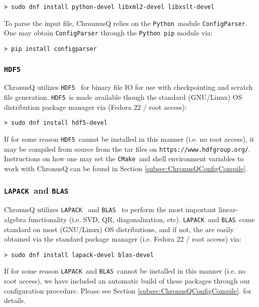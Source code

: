 \documentclass[12pt]{article}
\newcommand{\CMake}{\texttt{CMake}}
\newcommand{\HDF}{\texttt{HDF5}}
\newcommand{\LAPACK}{\texttt{LAPACK}}
\newcommand{\BLAS}{\texttt{BLAS}}
\newcommand{\Python}{\texttt{Python}}
\begin{document}
	\begin{lstlisting}
> sudo dnf install python-devel libxml2-devel libxslt-devel
	\end{lstlisting}

        \noindent To parse the input file, ChrounusQ relies on the \Python~module 
	\texttt{ConfigParser}. One may obtain \texttt{ConfigParser} through
	the \Python~\texttt{pip} module via:
	 
	\begin{lstlisting}
> pip install configparser
	\end{lstlisting}

      \subsubsection{\HDF} \label{subsubsec:HDF5} 
        ChronusQ utilizes \HDF~\cite{hdf5} for binary file IO for use with 
        checkpointing and scratch file generation. \HDF~is made available
	though the standard (GNU/Linux) OS distribution package manager via
	(Fedora 22 / root access):

	\begin{lstlisting}
> sudo dnf install hdf5-devel
	\end{lstlisting}

	\noindent If for some reason \HDF~cannot be installed in this manner (i.e. 
	no root access), it may be compiled from source from the tar files on
	\texttt{https://www.hdfgroup.org/}. Instructions on how one may set
	the \CMake~and shell environment variables to work with ChronusQ
	can be found in Section \ref{subsec:ChronusQConfigCompile}.

      \subsubsection{\LAPACK~and \BLAS} \label{subsubsec:LA} 
        ChronusQ utilizes \LAPACK~\cite{lapack} and \BLAS~\cite{blas1,blas2,blas3,atlas} to perform
        the most important linear-algebra functionality (i.e. SVD, QR, 
	diagonalization, etc). \LAPACK~and \BLAS~come standard on most
	(GNU/Linux) OS distributions, and if not, the are easily obtained via
	the standard package manager (i.e. Fedora 22 / root access) via:

	\begin{lstlisting}
> sudo dnf install lapack-devel blas-devel
	\end{lstlisting}

	\noindent If for some reason \LAPACK~and \BLAS~cannot be installed in this 
	manner (i.e. no root access), we have included an automatic build of these 
	packages through our configuration procedure. Please see Section 
	\ref{subsec:ChronusQConfigCompile}. for details.
\end{document}
